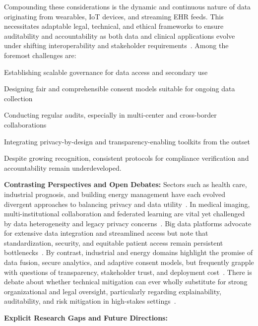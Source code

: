 \documentclass[sigconf]{acmart}
\begin{document}
Compounding these considerations is the dynamic and continuous nature of data originating from wearables, IoT devices, and streaming EHR feeds. This necessitates adaptable legal, technical, and ethical frameworks to ensure auditability and accountability as both data and clinical applications evolve under shifting interoperability and stakeholder requirements~\cite{ref51, ref56, ref61, ref63, ref65, ref70, ref72, ref75, ref76, ref78, ref82, ref84, ref90, ref91, ref106}. Among the foremost challenges are:

Establishing scalable governance for data access and secondary use

Designing fair and comprehensible consent models suitable for ongoing data collection

Conducting regular audits, especially in multi-center and cross-border collaborations

Integrating privacy-by-design and transparency-enabling toolkits from the outset

Despite growing recognition, consistent protocols for compliance verification and accountability remain underdeveloped.

\textbf{Contrasting Perspectives and Open Debates:} Sectors such as health care, industrial prognosis, and building energy management have each evolved divergent approaches to balancing privacy and data utility~\cite{ref51, ref83, ref71, ref72, ref84}. In medical imaging, multi-institutional collaboration and federated learning are vital yet challenged by data heterogeneity and legacy privacy concerns~\cite{ref51, ref54}. Big data platforms advocate for extensive data integration and streamlined access but note that standardization, security, and equitable patient access remain persistent bottlenecks~\cite{ref82, ref84}. By contrast, industrial and energy domains highlight the promise of data fusion, secure analytics, and adaptive consent models, but frequently grapple with questions of transparency, stakeholder trust, and deployment cost~\cite{ref71, ref72, ref76, ref77}. There is debate about whether technical mitigation can ever wholly substitute for strong organizational and legal oversight, particularly regarding explainability, auditability, and risk mitigation in high-stakes settings~\cite{ref83, ref91}.

\textbf{Explicit Research Gaps and Future Directions:}
\vspace{0.5em}
\end{document}
